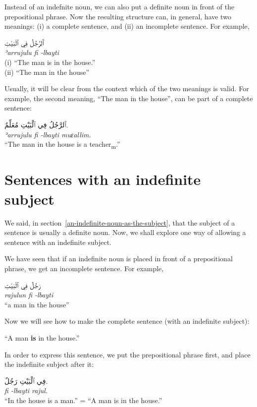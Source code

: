 \documentclass[
  10pt,
]{book}
\begin{document}
Instead of an indefnite noun, we can also put a definite noun in front of the prepositional phrase. Now the resulting structure can, in general, have two meanings: (i) a complete sentence, and (ii) an incomplete sentence. For example,

\foreignlanguage{arabic}{ٱَلرَّجُلُ فِي ٱلْبَيْتِ}\\
\emph{ʾarrujulu fi -lbayti}\\
(i) \enquote{The man is in the house.}\\
(ii) \enquote{The man in the house}

Usually, it will be clear from the context which of the two meanings is valid. For example, the second meaning, \enquote{The man in the house}, can be part of a complete sentence:

\foreignlanguage{arabic}{ٱَلرَّجُلُ فِي ٱلْبَيْتِ مُعَلِّمٌ.}\\
\emph{ʾarrujulu fi -lbayti muɛallim.}\\
\enquote{The man in the house is a teacher\textsubscript{m}.}

\section{Sentences with an indefinite subject}\label{sentences-with-an-indefinite-subject}

We said, in section~\ref{an-indefinite-noun-as-the-subject}, that the subject of a sentence is usually a definite noun. Now, we shall explore one way of allowing a sentence with an indefinite subject.

We have seen that if an indefinite noun is placed in front of a prepositional phrase, we get an incomplete sentence. For example,

\foreignlanguage{arabic}{رَجُلٌ فِي ٱلْبَيْتِ}\\
\emph{rajulun fi -lbayti}\\
\enquote{a man in the house}

Now we will see how to make the complete sentence (with an indefinite subject):

\enquote{A man \textbf{is} in the house.}

In order to express this sentence, we put the prepositional phrase first, and place the indefinite subject after it:

\foreignlanguage{arabic}{فِي ٱلْبَيْتِ رَجُلٌ.}\\
\emph{fi -lbayti rajul.}\\
\enquote{In the house is a man.} = \enquote{A man is in the house.}
\end{document}
